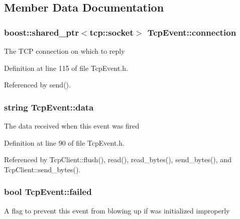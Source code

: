 \subsection{Member Data Documentation}
\hypertarget{classTcpEvent_a0cb428ee778cb7c867360b13617011c8}{
\subsubsection[{connection}]{\setlength{\rightskip}{0pt plus 5cm}boost::shared\_\-ptr$<$tcp::socket$>$ {\bf TcpEvent::connection}}}
\label{classTcpEvent_a0cb428ee778cb7c867360b13617011c8}
The TCP connection on which to reply 

Definition at line 115 of file TcpEvent.h.



Referenced by send().

\hypertarget{classTcpEvent_ade7277f4c6339286ea9551183630ee4c}{
\subsubsection[{data}]{\setlength{\rightskip}{0pt plus 5cm}string {\bf TcpEvent::data}}}
\label{classTcpEvent_ade7277f4c6339286ea9551183630ee4c}
The data received when this event was fired 

Definition at line 90 of file TcpEvent.h.



Referenced by TcpClient::flush(), read(), read\_\-bytes(), send\_\-bytes(), and TcpClient::send\_\-bytes().

\hypertarget{classTcpEvent_a80a093f4eab107723fbb0d45414f0a58}{
\subsubsection[{failed}]{\setlength{\rightskip}{0pt plus 5cm}bool {\bf TcpEvent::failed}}}
\label{classTcpEvent_a80a093f4eab107723fbb0d45414f0a58}
A flag to prevent this event from blowing up if was initialized improperly 

